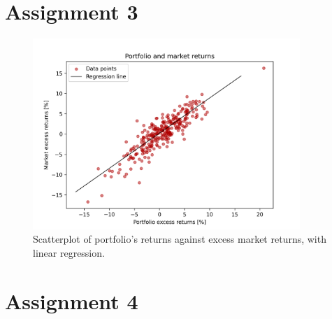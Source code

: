 \documentclass[12pt, openright, twoside]{report}
\begin{document}
\section*{Assignment 3}
\begin{figure}[h!]
    \centering
    \includegraphics[width=0.9\textwidth]{images/portfolio_regression.png}
    \caption{Scatterplot of portfolio's returns against excess market returns, with linear regression.}\label{fig:portfolio_regression}
\end{figure}
\section*{Assignment 4}
\end{document}

